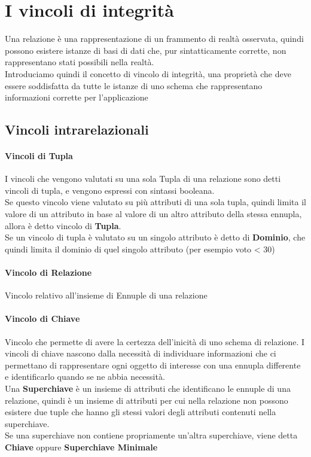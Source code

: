 \documentclass[12pt, a4paper, openany]{book}
\begin{document}
\section{I vincoli di integrità}
Una relazione è una rappresentazione di un frammento di realtà osservata, quindi possono esistere istanze di basi di dati che, pur sintatticamente corrette, non rappresentano stati possibili nella realtà.
\\Introduciamo quindi il concetto di vincolo di integrità, una proprietà che deve essere soddisfatta da tutte le istanze di uno schema che rappresentano informazioni corrette per l'applicazione
\subsection{Vincoli intrarelazionali}

\paragraph*{Vincoli di Tupla}
I vincoli che vengono valutati su una sola Tupla di una relazione sono detti vincoli di tupla, e vengono espressi con sintassi booleana.
\\Se questo vincolo viene valutato su più attributi di una sola tupla, quindi limita il valore di un attributo in base al valore di un altro attributo della stessa ennupla, allora è detto vincolo di \textbf{Tupla}.
\\Se un vincolo di tupla è valutato su un singolo attributo è detto di \textbf{Dominio}, che quindi limita il dominio di quel singolo attributo (per esempio voto < 30)


\paragraph*{Vincolo di Relazione}
Vincolo relativo all'insieme di Ennuple di una relazione

\paragraph*{Vincolo di Chiave}
Vincolo che permette di avere la certezza dell'inicità di uno schema di relazione. I vincoli di chiave nascono dalla necessità di individuare informazioni che ci permettano di rappresentare ogni oggetto di interesse con una ennupla differente e identificarlo quando se ne abbia necessità.
\\Una \textbf{Superchiave} è un insieme di attributi che identificano le ennuple di una relazione, quindi è un insieme di attributi per cui nella relazione non possono esistere due tuple che hanno gli stessi valori degli attributi contenuti nella superchiave.
\\Se una superchiave non contiene propriamente un'altra superchiave, viene detta \textbf{Chiave} oppure \textbf{Superchiave Minimale}
\end{document}
